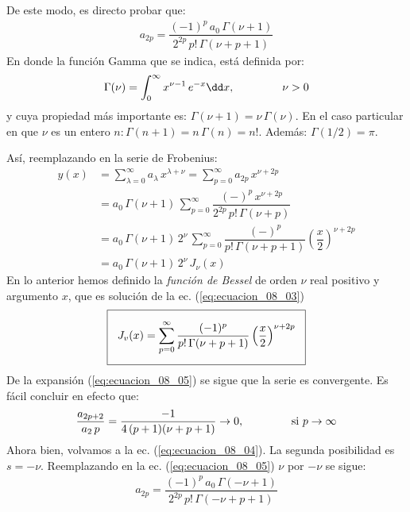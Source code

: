 De este modo, es directo probar que:
\begin{align}
a_{2p} = \dfrac{(-1)^{p} \, a_{0} \, \Gamma (\nu + 1)}{2^{2p} \, p! \, \Gamma (\nu + p + 1)}
\label{eq:ecuacion_08_05}
\end{align}
En donde la función Gamma que se indica, está definida por:
\begin{align*}
\Gamma (\nu) = \int_{0}^{\infty} x^{\nu-1} \, e^{-x} \dd x, \hspace{1.5cm} \nu > 0
\end{align*}
y cuya propiedad más importante es: $\Gamma (\nu + 1) = \nu \, \Gamma (\nu)$. En el caso particular en que $\nu$ es un entero $n: \Gamma (n + 1) = n \, \Gamma (n) = n!$. Además: $\Gamma (1/2) = \pi$.
\par
Así, reemplazando en la serie de Frobenius:
\begin{align*}
y(x) &= \sum_{\lambda=0}^{\infty} a_{\lambda} \, x^{\lambda+\nu} = \sum_{p=0}^{\infty} a_{2p} \, x^{\nu+2p} \\[0.5em]
&= a_{0} \, \Gamma (\nu + 1) \, \sum_{p=0}^{\infty} \dfrac{(-)^{p} \, x^{\nu+2p}}{2^{2p} \, p! \, \Gamma (\nu + p)} \\[0.5em]
&= a_{0} \, \Gamma (\nu + 1) \, 2^{\nu} \, \sum_{p=0}^{\infty} \dfrac{(-)^{p}}{p! \, \Gamma (\nu + p + 1)} \left( \dfrac{x}{2} \right)^{\nu+2p} \\[0.5em]
&= a_{0} \, \Gamma (\nu + 1) \, 2^{\nu} \, J_{\nu} (x)
\end{align*}
En lo anterior hemos definido la \emph{función de Bessel} de orden $\nu$ real positivo y argumento $x$, que es solución de la ec. (\ref{eq:ecuacion_08_03})
\begin{align}
\setlength{\fboxsep}{3\fboxsep}\boxed{
J_{v} (x) = \sum_{p=0}^{\infty} \dfrac{(-1)^{p}}{p! \, \Gamma (\nu + p + 1)} \left( \dfrac{x}{2} \right)^{\nu+2p}}
\label{eq:ecuacion_08_06}
\end{align}
De la expansión (\ref{eq:ecuacion_08_05}) se sigue que la serie es convergente. Es fácil concluir en efecto que:
\begin{align*}
\dfrac{a_{2p+2}}{a_{2} \, p} = \dfrac{-1}{4 \, (p+1)(\nu + p + 1)} \to 0,\hspace{1.5cm} \mbox{si } p \to \infty
\end{align*}
Ahora bien, volvamos a la ec. (\ref{eq:ecuacion_08_04}). La segunda posibilidad es $s = -\nu$. Reemplazando en la ec. (\ref{eq:ecuacion_08_05}) $\nu$ por $-\nu$ se sigue:
\begin{align*}
a_{2p} = \dfrac{(-1)^{p} \, a_{0} \, \Gamma (-\nu + 1)}{2^{2p} \, p! \, \Gamma (-\nu + p + 1)}
\end{align*}
